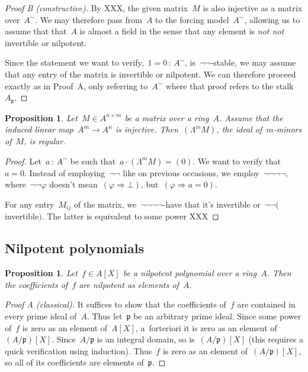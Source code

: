 \documentclass{amsart}
\theoremstyle{definition}
\theoremstyle{plain}
\newtheorem{prop}[defn]{Proposition}
\theoremstyle{remark}
\newcommand{\ppp}{\mathfrak{p}}
\newcommand{\?}{\,{:}\,}
\newcommand{\notnot}{\emph{not not}\xspace}
\newcommand{\negg}{\neg\!\!\!\neg}
\begin{document}
\begin{proof}[Proof B (constructive)]By XXX, the given matrix~$M$ is also
injective as a matrix over~$A^\sim$. We may therefore pass from~$A$ to the
forcing model~$A^\sim$, allowing us to assume that that~$A$ is almost a field
in the sense that any element is \notnot invertible or nilpotent.

Since the statement we want to verify,~$1 = 0 \? A^\sim$, is~$\neg\neg$-stable,
we may assume that any entry of the matrix is invertible or nilpotent. We can
therefore proceed exactly as in Proof~A, only referring to~$A^\sim$ where that
proof refers to the stalk~$A_\ppp$.
\end{proof}

\begin{prop}Let~$M \in A^{n \times m}$ be a matrix over a ring~$A$. Assume that
the induced linear map~$A^m \to A^n$ is injective. Then~$(\Lambda^m M)$, the
ideal of~$m$-minors of~$M$, is regular.
\end{prop}

\begin{proof}Let~$a \? A^\sim$ be such that~$a \cdot (\Lambda^m M) = (0)$. We want
to verify that~$a = 0$. Instead of employing~$\neg\neg$ like on previous
occasions, we employ~$\negg\negg$, where~$\negg\varphi$ doesn't mean~$(\varphi
\Rightarrow \bot)$, but~$(\varphi \Rightarrow a = 0)$.

For any entry~$M_{ij}$ of the matrix, we~$\negg\negg$-have that it's invertible
or~$\negg($invertible$)$. The latter is equivalent to some power XXX
\end{proof}


\subsection{Nilpotent polynomials}

\begin{prop}Let~$f \in A[X]$ be a nilpotent polynomial over a ring~$A$. Then
the coefficients of~$f$ are nilpotent as elements of~$A$.
\end{prop}

\begin{proof}[Proof A (classical)]It suffices to show that the coefficients
of~$f$ are contained in every prime ideal of~$A$. Thus let~$\ppp$ be an
arbitrary prime ideal. Since some power of~$f$ is zero as an element of~$A[X]$,
a~forteriori it is zero as an element of~$(A/\ppp)[X]$. Since~$A/\ppp$ is an
integral domain, so is~$(A/\ppp)[X]$ (this requires a quick verification using
induction). Thus~$f$ is zero as an element of~$(A/\ppp)[X]$, so all of its
coefficients are elements of~$\ppp$.
\end{proof}
\end{document}
